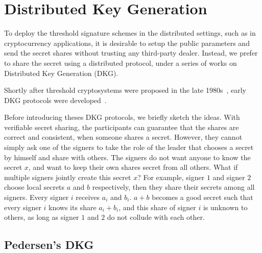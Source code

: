 \section{Distributed Key Generation} \label{sec:dkg}

To deploy the threshold signature schemes in the distributed settings, such as in cryptocurrency applications, it is desirable to setup the public parameters and send the secret shares without trusting any third-party dealer. Instead, we prefer to share the secret using a distributed protocol, under a series of works on Distributed Key Generation (DKG). 

Shortly after threshold cryptosystems were proposed in the late 1980s~\cite{DBLP:conf/crypto/DesmedtF89}, early DKG protocols were developed~\cite{DBLP:conf/eurocrypt/Pedersen91a}. 

Before introducing theses DKG protocols, we briefly sketch the ideas. With verifiable secret sharing, the participants can guarantee that the shares are correct and consistent, when someone shares a secret. However, they cannot simply ask one of the signers to take the role of the leader that chooses a secret by himself and share with others. The signers do not want anyone to know the secret $x$, and want to keep their own shares secret from all others. What if multiple signers jointly create this secret $x$? For example, signer $1$ and signer $2$ choose local secrets $a$ and $b$ respectively, then they share their secrets among all signers. Every signer $i$ receives $a_i$ and $b_i$. $a+b$ becomes a good secret such that every signer $i$ knows its share $a_i+b_i$, and this share of signer $i$ is unknown to others, as long as signer $1$ and $2$ do not collude with each other. 

\subsection{Pedersen's DKG}

